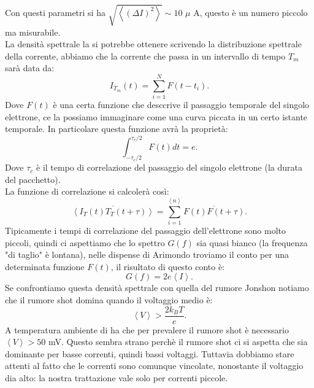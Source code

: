 Con questi parametri si ha $\sqrt{\left<\left( \Delta I \right)^2\right>} \sim 10$ $\mu$ A, questo è un numero piccolo ma misurabile.\\
La densità spettrale la si potrebbe ottenere scrivendo la distribuzione spettrale della corrente, abbiamo che la corrente che passa in un intervallo di tempo $T_m$ sarà data da:
\[
	I_{T_m}( t) =
	\sum_{i=1}^{N} F( t-t_i) 
.\] 
Dove $F(t)$ è una certa funzione che desccrive il passaggio temporale del singolo elettrone, ce la possiamo immaginare come una curva piccata in un certo istante temporale. In particolare questa funzione avrà la proprietà:
\[
	\int_{- \tau_c/2}^{\tau_c/2} F( t) dt = e 
.\] 
Dove $\tau_c$ è il tempo di correlazione del passaggio del singolo elettrone (la durata del pacchetto).\\
La funzione di correlazione si calcolerà così:
\[
	\overline{\left<I_T( t) T_T( t + \tau )  \right>}
	=
	\sum_{i = 1}^{\left<n \right>} \overline{F( t) F( t + \tau ) }
.\] 
Tipicamente i tempi di correlazione del passaggio dell'elettrone sono molto piccoli, quindi ci aspettiamo che lo spettro $G(f)$ sia quasi bianco (la frequenza "di taglio" è lontana), nelle dispense di Arimondo troviamo il conto per una determinata funzione $F(t)$, il risultato di questo conto è:
\[
	G(f) = 2e \left<I\right> 
.\] 
Se confrontiamo questa densità spettrale con quella del rumore Jonshon notiamo che il rumore shot domina quando il voltaggio medio è:
 \[
	\left<V\right> > \frac{2k_BT}{e}
.\] 
A temperatura ambiente di ha che per prevalere il rumore shot è necessario $\left<V \right> > 50$ mV. 
Questo sembra strano perchè il rumore shot ci si aspetta che sia dominante per basse correnti, quindi bassi voltaggi. 
Tuttavia dobbiamo stare attenti al fatto che le correnti sono comunque vincolate, nonostante il voltaggio dia alto: la nostra trattazione vale solo per correnti piccole.


